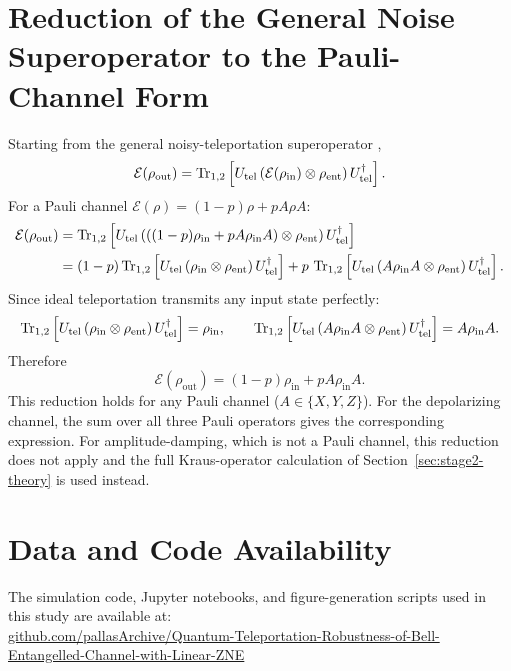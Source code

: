 \documentclass[11pt]{article}
\begin{document}
\section{Reduction of the General Noise Superoperator to the Pauli-Channel Form}
\label{app:reduction}

Starting from the general noisy-teleportation superoperator \citep[Eq.~8]{oh2002},
\begin{equation}
\mathcal{E}(\rho_{\text{out}}) = \Tr_{1,2}\left[U_{\text{tel}}\left(\mathcal{E}(\rho_{\text{in}})\otimes\rho_{\text{ent}}\right)U_{\text{tel}}^\dagger\right].
\label{eq:app-start}
\end{equation}
For a Pauli channel $\mathcal{E}(\rho)=(1-p)\rho+pA\rho A$:
\begin{align}
\mathcal{E}(\rho_{\text{out}}) &= \Tr_{1,2}\left[U_{\text{tel}}\left(\left((1-p)\rho_{\text{in}}+pA\rho_{\text{in}}A\right)\otimes\rho_{\text{ent}}\right)U_{\text{tel}}^\dagger\right] \label{eq:app1}\\
&= (1-p)\Tr_{1,2}\left[U_{\text{tel}}\left(\rho_{\text{in}}\otimes\rho_{\text{ent}}\right)U_{\text{tel}}^\dagger\right] + p\,\Tr_{1,2}\left[U_{\text{tel}}\left(A\rho_{\text{in}}A\otimes\rho_{\text{ent}}\right)U_{\text{tel}}^\dagger\right]. \label{eq:app2}
\end{align}
Since ideal teleportation transmits any input state perfectly:
\begin{equation}
\Tr_{1,2}\left[U_{\text{tel}}\left(\rho_{\text{in}}\otimes\rho_{\text{ent}}\right)U_{\text{tel}}^\dagger\right] = \rho_{\text{in}}, \qquad
\Tr_{1,2}\left[U_{\text{tel}}\left(A\rho_{\text{in}}A\otimes\rho_{\text{ent}}\right)U_{\text{tel}}^\dagger\right] = A\rho_{\text{in}}A.
\label{eq:app3}
\end{equation}
Therefore
\begin{equation}
\mathcal{E}(\rho_{\text{out}}) = (1-p)\rho_{\text{in}} + pA\rho_{\text{in}}A.
\label{eq:app-final}
\end{equation}
This reduction holds for any Pauli channel ($A\in\{X,Y,Z\}$). For the depolarizing channel, the sum over all three Pauli operators gives the corresponding expression. For amplitude-damping, which is not a Pauli channel, this reduction does not apply and the full Kraus-operator calculation of Section~\ref{sec:stage2-theory} is used instead.

\section*{Data and Code Availability}
The simulation code, Jupyter notebooks, and figure-generation scripts used in this study are available at:\\
\href{https://github.com/pallasArchive/Quantum-Teleportation-Robustness-of-Bell-Entangelled-Channel-with-Linear-ZNE}{github.com/pallasArchive/Quantum-Teleportation-Robustness-of-Bell-Entangelled-Channel-with-Linear-ZNE}
\end{document}
